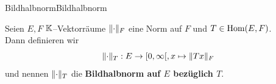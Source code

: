 \begin{definition}{Bildhalbnorm}{Bildhalbnorm}

Seien $E,F$ $\mathbb{K}$--Vektorräume $\lVert\cdot\rVert_F$ eine Norm auf $F$ und
$T \in \mathop{\textrm{Hom}}\nolimits(E, F)$.\\
Dann definieren wir
\[\lVert\cdot\rVert_T: E \rightarrow [0, \infty[, x \mapsto \lVert Tx\rVert_F\] 
und nennen $\lVert\cdot\rVert_T$ die \textbf{Bildhalbnorm auf $E$ bezüglich $T$}.
\end{definition}